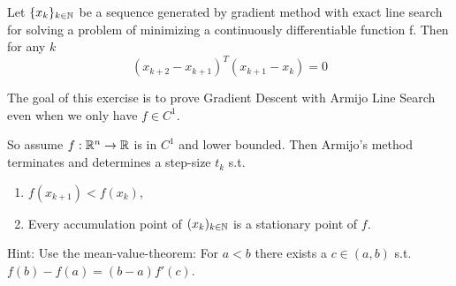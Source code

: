 \documentclass{ExerciseSheet}
\newif\ifsolutions
\begin{document}
\begin{exo}
Let $\{x_k\}_{k\in \mathbb{N}}$ be a sequence generated by gradient method with exact line search for solving a problem of minimizing a continuously differentiable function f. Then for any $k$
\begin{equation*}
    \left(x_{k+2} - x_{k+1}\right)^T\left(x_{k+1}-x_k\right) = 0
\end{equation*}
\end{exo}

\ifsolutions
\vskip 0.3cm
\begin{solution}
We have $x_{k+1}-x_k=-t_k \nabla f(x_k)$ for all $k$, hence the above simplifies to 
\begin{equation*}
    t_{k+1}t_k\nabla f(x_{k+1})^T \nabla f(x_k) = 0,
\end{equation*}
which is the case (since $t_k>0$) iff 
\begin{equation*}
   \nabla f(x_{k+1})^T \nabla f(x_k) = 0,
\end{equation*}
We know $t_k \in \argmin_{t > 0} g(t):=f(x_k - t \nabla f(x_k))$, so $0= g'(t_k)= -\nabla f(x_k)^T \nabla f(x_k - t_k \nabla f(x_k))= - \nabla f(x_k)^T \nabla f(x_{k+1})$
\end{solution}

\fi

\vskip 0.5cm
\begin{exo}
The goal of this exercise is to prove Gradient Descent with Armijo Line Search even when we only have $f\in C^1.$

So assume $f: \mathbb{R}^n \rightarrow \mathbb{R}$ is in $C^1$ and lower bounded. Then Armijo's method terminates and determines a step-size $t_k$ s.t. 
\begin{enumerate} 
    \item $f(x_{k+1}) < f(x_k)$,
    \item Every accumulation point of $(x_k)_{k \in \mathbb{N}}$ is a stationary point of $f$.
\end{enumerate}
Hint: Use the mean-value-theorem: For $a<b$ there exists a $c \in (a,b)$ s.t. $f(b) - f(a) = (b-a) f'(c)$.
\end{exo}


\ifsolutions
\vskip 0.3cm
\begin{solution}
First part is clear. \\
Why does the Armijo step size rule always terminate?? \\

1. Show $f(x_k)$ converges \\
 2. Show $t_k\|\nabla f(x_k)\|^2$ converges to zero. \\
3. Assume the sequence does not converge to a stationary point
\end{solution}
\fi
\end{document}

